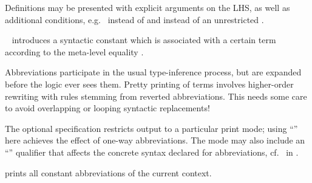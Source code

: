 \begin{isabellebody}
\begin{isamarkuptext}
\begin{description}
  Definitions may be presented with explicit arguments on the LHS, as
  well as additional conditions, e.g.\  instead of
   and  instead of an
  unrestricted .
  
  \item \hyperlink{command.abbreviation}{\mbox{}}~ introduces a
  syntactic constant which is associated with a certain term according
  to the meta-level equality .
  
  Abbreviations participate in the usual type-inference process, but
  are expanded before the logic ever sees them.  Pretty printing of
  terms involves higher-order rewriting with rules stemming from
  reverted abbreviations.  This needs some care to avoid overlapping
  or looping syntactic replacements!
  
  The optional  specification restricts output to a
  particular print mode; using ``'' here achieves the
  effect of one-way abbreviations.  The mode may also include an
  ``\hyperlink{keyword.output}{\mbox{}}'' qualifier that affects the concrete syntax
  declared for abbreviations, cf.\ \hyperlink{command.syntax}{\mbox{}} in
  .
  
  \item \hyperlink{command.print-abbrevs}{\mbox{}} prints all constant abbreviations
  of the current context.
  

\end{description}
\end{isamarkuptext}
\end{isabellebody}
